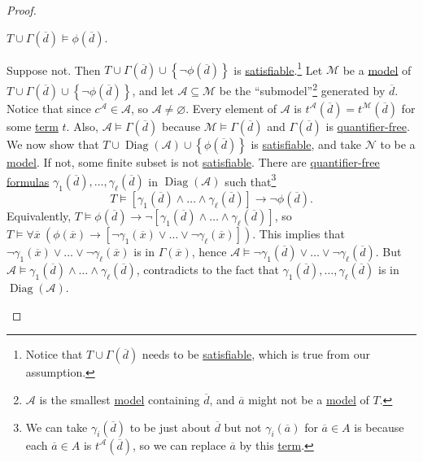 \begin{proof}
	\begin{claim}
		\(T\cup \Gamma (\overline{d} ) \models \phi (\overline{d} )\).
	\end{claim}
	\begin{explanation}
		Suppose not. Then \(T \cup \Gamma (\overline{d} ) \cup \left\{ \lnot \phi (\overline{d} ) \right\} \) is \hyperref[def:satisfiable]{satisfiable}.\footnote{Notice that \(T \cup \Gamma (\overline{d} )\) needs to be \hyperref[def:satisfiable]{satisfiable}, which is true from our assumption.} Let \(\mathcal{M}\) be a \hyperref[def:model]{model} of \(T \cup \Gamma (\overline{d} ) \cup \left\{ \lnot \phi (\overline{d} ) \right\} \), and let \(\mathcal{A} \subseteq \mathcal{M} \) be the ``submodel''\footnote{\(\mathcal{A} \) is the smallest \hyperref[def:model]{model} containing \(\overline{d} \), and \(\overline{a} \) might not be a \hyperref[def:model]{model} of \(T\).} generated by \(\overline{d} \). Notice that since \(c^{\mathcal{A} } \in \mathcal{A} \), so \(\mathcal{A} \neq \varnothing \). Every element of \(\mathcal{A} \) is \(t^{\mathcal{A} }(\overline{d} ) = t^{\mathcal{M} }(\overline{d} ) \) for some \hyperref[def:term]{term} \(t\). Also, \(\mathcal{A} \models \Gamma (\overline{d} )\) because \(\mathcal{M} \models \Gamma (\overline{d} )\) and \(\Gamma (\overline{d} )\) is \hyperref[not:quantifier-free]{quantifier-free}. We now show that \(T \cup \mathop{\mathrm{Diag}}(\mathcal{A} ) \cup \left\{ \phi (\overline{d} ) \right\} \) is \hyperref[def:satisfiable]{satisfiable}, and take \(\mathcal{N} \) to be a \hyperref[def:model]{model}. If not, some finite subset is not \hyperref[def:satisfiable]{satisfiable}. There are \hyperref[not:quantifier-free]{quantifier-free} \hyperref[def:formula]{formulas} \(\gamma _1(\overline{d} ), \dots , \gamma _\ell (\overline{d} )\) in \(\mathop{\mathrm{Diag}}(\mathcal{A} ) \) such that\footnote{We can take \(\gamma _i(\overline{d} )\) to be just about \(\overline{d} \) but not \(\gamma _i(\overline{a} )\) for \(\overline{a} \in A\) is because each \(\overline{a} \in A\) is \(t^{\mathcal{A} } (\overline{d} )\), so we can replace \(\overline{a} \) by this \hyperref[def:term]{term}.}
		\[
			T \models \left[ \gamma _1(\overline{d} ) \land \dots \land \gamma _\ell (\overline{d} ) \right] \to \lnot \phi (\overline{d} ).
		\]
		Equivalently, \(T \models \phi (\overline{d} ) \to \lnot \left[ \gamma _1(\overline{d} ) \land \dots \land \gamma _\ell (\overline{d} ) \right] \), so \(T \models \forall \overline{x}\ \left( \phi (\overline{x} ) \to \left[ \lnot \gamma _1(\overline{x} ) \lor \dots \lor \lnot \gamma _\ell (\overline{x} ) \right]  \right) \). This implies that \(\lnot \gamma _1(\overline{x} ) \lor \dots \lor \lnot \gamma _\ell (\overline{x} )\) is in \(\Gamma (\overline{x} )\), hence \(\mathcal{A} \models \lnot \gamma _1(\overline{d} ) \lor \dots \lor \lnot \gamma _\ell (\overline{d} )\). But \(\mathcal{A} \models \gamma _1(\overline{d} ) \land \dots \land \gamma _\ell (\overline{d} )\), contradicts to the fact that \(\gamma _1(\overline{d} ), \dots , \gamma _\ell (\overline{d} )\) is in \(\mathop{\mathrm{Diag}}(\mathcal{A} ) \).


\end{explanation}
\end{proof}
